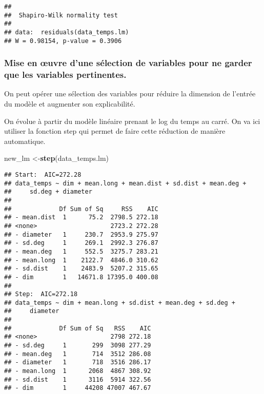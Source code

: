 \documentclass[
]{article}
\newenvironment{Shaded}{\begin{snugshade}}{\end{snugshade}}
\newcommand{\KeywordTok}[1]{\textcolor[rgb]{0.13,0.29,0.53}{\textbf{#1}}}
\newcommand{\NormalTok}[1]{#1}
\begin{document}
\begin{verbatim}
## 
##  Shapiro-Wilk normality test
## 
## data:  residuals(data_temps.lm)
## W = 0.98154, p-value = 0.3906
\end{verbatim}

\hypertarget{mise-en-uvre-dune-suxe9lection-de-variables-pour-ne-garder-que-les-variables-pertinentes.}{%
\subsubsection{\texorpdfstring{Mise en \oe uvre d'une sélection de
variables pour ne garder que les variables
pertinentes.}{Mise en uvre d'une sélection de variables pour ne garder que les variables pertinentes.}}\label{mise-en-uvre-dune-suxe9lection-de-variables-pour-ne-garder-que-les-variables-pertinentes.}}

On peut opérer une sélection des variables pour réduire la dimension de
l'entrée du modèle et augmenter son explicabilité.

On évolue à partir du modèle linéaire prenant le log du temps au carré.
On va ici utiliser la fonction step qui permet de faire cette réduction
de manière automatique.

\begin{Shaded}
\begin{Highlighting}[]
\NormalTok{new_lm <-}\KeywordTok{step}\NormalTok{(data_temps.lm)}
\end{Highlighting}
\end{Shaded}

\begin{verbatim}
## Start:  AIC=272.28
## data_temps ~ dim + mean.long + mean.dist + sd.dist + mean.deg + 
##     sd.deg + diameter
## 
##             Df Sum of Sq     RSS    AIC
## - mean.dist  1      75.2  2798.5 272.18
## <none>                    2723.2 272.28
## - diameter   1     230.7  2953.9 275.97
## - sd.deg     1     269.1  2992.3 276.87
## - mean.deg   1     552.5  3275.7 283.21
## - mean.long  1    2122.7  4846.0 310.62
## - sd.dist    1    2483.9  5207.2 315.65
## - dim        1   14671.8 17395.0 400.08
## 
## Step:  AIC=272.18
## data_temps ~ dim + mean.long + sd.dist + mean.deg + sd.deg + 
##     diameter
## 
##             Df Sum of Sq   RSS    AIC
## <none>                    2798 272.18
## - sd.deg     1       299  3098 277.29
## - mean.deg   1       714  3512 286.08
## - diameter   1       718  3516 286.17
## - mean.long  1      2068  4867 308.92
## - sd.dist    1      3116  5914 322.56
## - dim        1     44208 47007 467.67
\end{verbatim}
\end{document}
